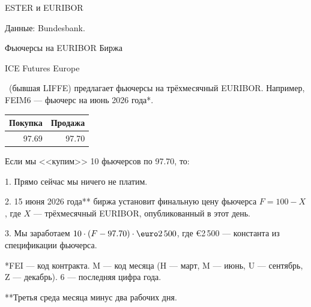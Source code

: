 \documentclass{beamer}
\renewcommand{\EUR}[1]{\textup{\euro}#1}
\newcommand{\en}[1]{\begin{otherlanguage}{english}#1\end{otherlanguage}}
\begin{document}
\begin{frame}{ESTER и EURIBOR}
\centering
{}

\scriptsize Данные: Bundesbank.
\end{frame}



\begin{frame}{Фьючерсы на EURIBOR}
\justify
Биржа \en{ICE Futures Europe}\ (бывшая LIFFE) предлагает фьючерсы на трёхмесячный EURIBOR. Например, \alert{FEIM6} --- фьючерс на июнь 2026 года*.

\justify
\centering
\begin{tabular}{r|r}
Покупка & Продажа \\ \hline
97.69 & 97.70
\end{tabular}

\justify
Если мы <<купим>> 10 фьючерсов по 97.70, то:

1. Прямо сейчас мы ничего не платим.

2. 15 июня 2026 года** биржа установит финальную цену фьючерса $F = 100 - X$, где 
$X$ --- трёхмесячный EURIBOR, опубликованный в этот день.

3. Мы заработаем $10 \cdot (F - 97.70) \cdot \EUR{2\,500}$, где \EUR{2\,500} --- 
константа из спецификации фьючерса.

\justify
*FEI --- код контракта. M --- код месяца (H --- март, M --- июнь, U --- сентябрь, Z --- 
декабрь). 6 --- последняя цифра года.

\justify
**Третья среда месяца минус два рабочих дня.
\end{frame}
\end{document}
